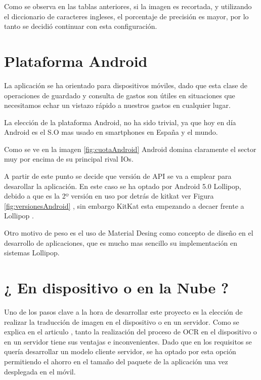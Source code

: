 Como se observa en las tablas anteriores, si la imagen es recortada, y utilizando el diccionario de caracteres ingleses, el porcentaje de precisión es mayor, por lo tanto se decidió continuar con esta configuración.

\section{Plataforma Android}

La aplicación se ha orientado para dispositivos móviles, dado que esta clase de operaciones de guardado y consulta de gastos son útiles en situaciones que necesitamos echar un vistazo rápido a nuestros gastos en cualquier lugar.

La elección de la plataforma Android, no ha sido trivial, ya que hoy en día Android es el S.O mas usado en smartphones en España y el mundo.

Como se ve en la imagen \ref{fig:cuotaAndroid} Android domina claramente el sector muy por encima de su principal rival IOs.

A partir de este punto se decide que versión de API se va a emplear para desarollar la aplicación. En este caso se ha optado por Android 5.0 Lollipop, debido a que es la 2º versión en uso por detrás de kitkat ver Figura \ref{fig:versionesAndroid} , sin embargo KitKat esta empezando a decaer frente a Lollipop	. \cite{versionesAndroid}

Otro motivo de peso es el uso de Material Desing como concepto de diseño en el desarrollo de aplicaciones, que es mucho mas sencillo su implementación en sistemas Lollipop.


\section{¿ En dispositivo o en la Nube ?}

Uno de los pasos clave a la hora de desarrollar este proyecto es la elección de realizar la traducción de imagen en el dispositivo o en un servidor.
Como se explica en el articulo \cite{localVScloud}, tanto la realización del proceso de OCR en el dispositivo o en un servidor tiene sus ventajas e inconvenientes.
Dado que en los requisitos se quería desarrollar un modelo cliente servidor, se ha optado por esta opción permitiendo el ahorro en el tamaño del paquete de la aplicación una vez desplegada en el móvil.

